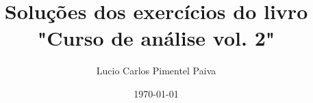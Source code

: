 \documentclass[12pt,a4paper]{article}
\begin{document}
\title{Soluções dos exercícios do livro "Curso de análise vol. 2"}
\author{Lucio Carlos Pimentel Paiva}
\date{\today}

\maketitle














\end{document}
